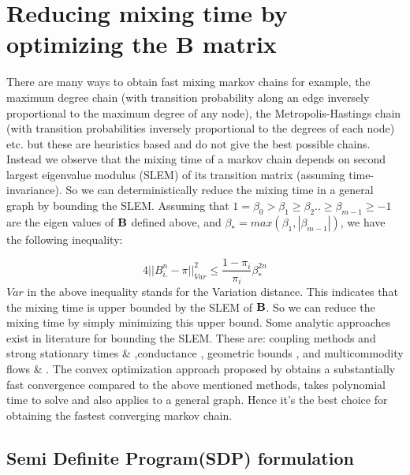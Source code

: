 \documentclass{article}
\begin{document}
\section{Reducing mixing time by optimizing the B matrix}

There are many ways to obtain fast mixing markov chains for example, the maximum degree chain (with transition probability along an edge inversely proportional to the maximum degree of any node), the Metropolis-Hastings chain (with transition probabilities inversely proportional to the degrees of each node) etc. but these are heuristics based and do not give the best possible chains. Instead we observe that the mixing time of a markov chain depends on second largest eigenvalue modulus (SLEM) \cite{Boyd03fastestmixing} of its transition matrix (assuming time-invariance). So we can deterministically reduce the mixing time in a general graph by bounding the SLEM. Assuming that $1=\beta_0 > \beta_1 \geq \beta_2 .. \geq \beta_{m-1} \geq -1$ are the eigen values of $\bf B$ defined above, and $\beta_* = max(\beta_1,|\beta_{m-1}|)$, we have the following inequality:

\begin{equation}
 4||B_{i.}^n - \pi||_{Var}^2 \leq \frac{1-\pi_i}{\pi_i} \beta_*^{2n}
\end{equation}
$Var$ in the above inequality stands for the Variation distance. This indicates that the mixing time is upper bounded by the SLEM of $\bf B$. So we can reduce the mixing time by simply minimizing this upper bound. Some analytic approaches exist in literature for bounding the SLEM. These are: coupling methods and strong stationary times \cite{aldous1983random} \& \cite{diaconis1988group},conductance \cite{jerrum1989approximating}, geometric bounds \cite{diaconis1991geometric}, and multicommodity flows \cite{sinclair1992improved} \& \cite{kahale1997semidefinite}. The convex optimization approach proposed by \cite{Boyd03fastestmixing} obtains a substantially fast convergence compared to the above mentioned methods, takes polynomial time to solve and also applies to a general graph. Hence it's the best choice for obtaining the fastest converging markov chain.

\subsection{Semi Definite Program(SDP) formulation}
\end{document}
